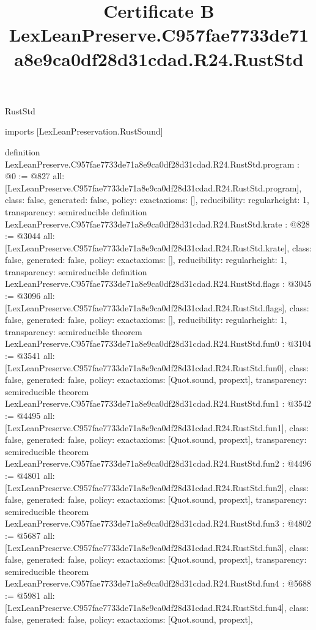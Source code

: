 \begin{lexlean}{RustStd}
\title{Certificate B LexLeanPreserve.C957fae7733de71a8e9ca0df28d31cdad.R24.RustStd}
\begin{coremodule}
imports [LexLeanPreservation.RustSound]

definition LexLeanPreserve.C957fae7733de71a8e9ca0df28d31cdad.R24.RustStd.program : @0 := @827 {
  all: [LexLeanPreserve.C957fae7733de71a8e9ca0df28d31cdad.R24.RustStd.program],
  class: false,
  generated: false,
  policy: exact{axioms: []},
  reducibility: regular{height: 1},
  transparency: semireducible
}
definition LexLeanPreserve.C957fae7733de71a8e9ca0df28d31cdad.R24.RustStd.krate : @828 := @3044 {
  all: [LexLeanPreserve.C957fae7733de71a8e9ca0df28d31cdad.R24.RustStd.krate],
  class: false,
  generated: false,
  policy: exact{axioms: []},
  reducibility: regular{height: 1},
  transparency: semireducible
}
definition LexLeanPreserve.C957fae7733de71a8e9ca0df28d31cdad.R24.RustStd.flags : @3045 := @3096 {
  all: [LexLeanPreserve.C957fae7733de71a8e9ca0df28d31cdad.R24.RustStd.flags],
  class: false,
  generated: false,
  policy: exact{axioms: []},
  reducibility: regular{height: 1},
  transparency: semireducible
}
theorem LexLeanPreserve.C957fae7733de71a8e9ca0df28d31cdad.R24.RustStd.fun0 : @3104 := @3541 {
  all: [LexLeanPreserve.C957fae7733de71a8e9ca0df28d31cdad.R24.RustStd.fun0],
  class: false,
  generated: false,
  policy: exact{axioms: [Quot.sound, propext]},
  transparency: semireducible
}
theorem LexLeanPreserve.C957fae7733de71a8e9ca0df28d31cdad.R24.RustStd.fun1 : @3542 := @4495 {
  all: [LexLeanPreserve.C957fae7733de71a8e9ca0df28d31cdad.R24.RustStd.fun1],
  class: false,
  generated: false,
  policy: exact{axioms: [Quot.sound, propext]},
  transparency: semireducible
}
theorem LexLeanPreserve.C957fae7733de71a8e9ca0df28d31cdad.R24.RustStd.fun2 : @4496 := @4801 {
  all: [LexLeanPreserve.C957fae7733de71a8e9ca0df28d31cdad.R24.RustStd.fun2],
  class: false,
  generated: false,
  policy: exact{axioms: [Quot.sound, propext]},
  transparency: semireducible
}
theorem LexLeanPreserve.C957fae7733de71a8e9ca0df28d31cdad.R24.RustStd.fun3 : @4802 := @5687 {
  all: [LexLeanPreserve.C957fae7733de71a8e9ca0df28d31cdad.R24.RustStd.fun3],
  class: false,
  generated: false,
  policy: exact{axioms: [Quot.sound, propext]},
  transparency: semireducible
}
theorem LexLeanPreserve.C957fae7733de71a8e9ca0df28d31cdad.R24.RustStd.fun4 : @5688 := @5981 {
  all: [LexLeanPreserve.C957fae7733de71a8e9ca0df28d31cdad.R24.RustStd.fun4],
  class: false,
  generated: false,
  policy: exact{axioms: [Quot.sound, propext]},
}
\end{coremodule}
\end{lexlean}
